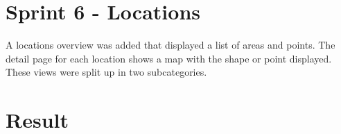 %
\section{Sprint 6 - Locations}
A locations overview was added that displayed a list of areas and points. The detail page for each location shows a map with the shape or point displayed. These views were split up in two subcategories.

%
\section{Result}
